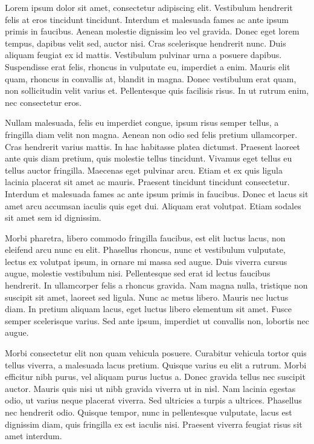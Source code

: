 Lorem ipsum dolor sit amet, consectetur adipiscing elit. Vestibulum hendrerit felis at eros tincidunt tincidunt. Interdum et malesuada fames ac ante ipsum primis in faucibus. Aenean molestie dignissim leo vel gravida. Donec eget lorem tempus, dapibus velit sed, auctor nisi. Cras scelerisque hendrerit nunc. Duis aliquam feugiat ex id mattis. Vestibulum pulvinar urna a posuere dapibus. Suspendisse erat felis, rhoncus in vulputate eu, imperdiet a enim. Mauris elit quam, rhoncus in convallis at, blandit in magna. Donec vestibulum erat quam, non sollicitudin velit varius et. Pellentesque quis facilisis risus. In ut rutrum enim, nec consectetur eros.

Nullam malesuada, felis eu imperdiet congue, ipsum risus semper tellus, a fringilla diam velit non magna. Aenean non odio sed felis pretium ullamcorper. Cras hendrerit varius mattis. In hac habitasse platea dictumst. Praesent laoreet ante quis diam pretium, quis molestie tellus tincidunt. Vivamus eget tellus eu tellus auctor fringilla. Maecenas eget pulvinar arcu. Etiam et ex quis ligula lacinia placerat sit amet ac mauris. Praesent tincidunt tincidunt consectetur. Interdum et malesuada fames ac ante ipsum primis in faucibus. Donec et lacus sit amet arcu accumsan iaculis quis eget dui. Aliquam erat volutpat. Etiam sodales sit amet sem id dignissim.

Morbi pharetra, libero commodo fringilla faucibus, est elit luctus lacus, non eleifend arcu nunc eu elit. Phasellus rhoncus, nunc et vestibulum vulputate, lectus ex volutpat ipsum, in ornare mi massa sed augue. Duis viverra cursus augue, molestie vestibulum nisi. Pellentesque sed erat id lectus faucibus hendrerit. In ullamcorper felis a rhoncus gravida. Nam magna nulla, tristique non suscipit sit amet, laoreet sed ligula. Nunc ac metus libero. Mauris nec luctus diam. In pretium aliquam lacus, eget luctus libero elementum sit amet. Fusce semper scelerisque varius. Sed ante ipsum, imperdiet ut convallis non, lobortis nec augue.

Morbi consectetur elit non quam vehicula posuere. Curabitur vehicula tortor quis tellus viverra, a malesuada lacus pretium. Quisque varius eu elit a rutrum. Morbi efficitur nibh purus, vel aliquam purus luctus a. Donec gravida tellus nec suscipit auctor. Mauris quis nisi ut nibh gravida viverra ut in nisl. Nam lacinia egestas odio, ut varius neque placerat viverra. Sed ultricies a turpis a ultrices. Phasellus nec hendrerit odio. Quisque tempor, nunc in pellentesque vulputate, lacus est dignissim diam, quis fringilla ex est iaculis nisi. Praesent viverra feugiat risus sit amet interdum.

